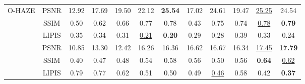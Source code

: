 \documentclass[journal]{IEEEtran}
\begin{document}
\begin{table}
\begin{center}
{\begin{tabular}{ c | c | c | c | c | c | c | c | c | c | c | c }
				\multirow{4}{*}{O-HAZE}     & PSNR                    & 12.92                  & 17.69               & 19.50                   & 22.12                & \textbf{25.54}      & 17.02                      & 24.61                             & 19.47                   & \underline{25.25}                & 24.54                 \\
				                            & SSIM                    & 0.50                   & 0.62                & 0.66                    & 0.77                 & 0.78                & 0.43                       & 0.75                              & 0.74                    & \underline{0.78}                 & \textbf{0.79}         \\
				                            & LIPIS                   & 0.35                   & 0.34                & 0.31                    & \underline{0.21}     & \textbf{0.20}       & 0.29                       & 0.28                              & 0.39                    & 0.33                             & 0.24                  \\
				\hline

				\multirow{4}{*}{DENSE-HAZE} & PSNR                    & 10.85                  & 13.30               & 12.42                   & 16.26                & 16.36               & 16.62                      & 16.67                             & 16.34                   & \underline{17.45}                & \textbf{17.79}        \\
				                            & SSIM                    & 0.40                   & 0.47                & 0.48                    & 0.54                 & 0.58                & 0.56                       & 0.50                              & 0.56                    & \textbf{0.64}                    & \underline{0.62}      \\
				                            & LIPIS                   & 0.79                   & 0.77                & 0.62                    & 0.51                 & 0.50                & 0.49                       & \underline{0.46}                  & 0.58                    & 0.42                             & \textbf{0.37}         \\
				\hline


\end{tabular}}
\end{center}
\end{table}
\end{document}
